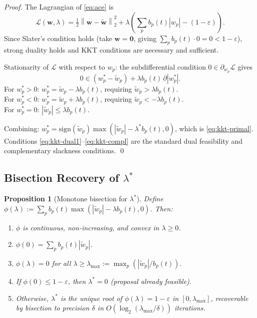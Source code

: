 \documentclass[12pt,letterpaper]{article}
\newtheorem{proposition}[theorem]{Proposition}
\newcommand{\Hnorm}[1]{\left\|#1\right\|}
\newcommand{\bp}{b_p(t)}
\newcommand{\eps}{\varepsilon}
\newcommand{\lam}{\lambda}
\newcommand{\lamstar}{\lambda^*}
\begin{document}
\begin{proof}
The Lagrangian of \eqref{eq:ace} is
\[
  \mathcal{L}(\mathbf{w}, \lam)
  = \tfrac{1}{2}\Hnorm{\mathbf{w} - \tilde{\mathbf{w}}}_2^2
  + \lam\!\left(\sum_p \bp |w_p| - (1-\eps)\right).
\]
Since Slater's condition holds (take $\mathbf{w} = \mathbf{0}$, giving
$\sum_p \bp \cdot 0 = 0 < 1-\eps$), strong duality holds and KKT
conditions are necessary and sufficient.

Stationarity of $\mathcal{L}$ with respect to $w_p$: the subdifferential
condition $0 \in \partial_{w_p}\mathcal{L}$ gives
\[
  0 \in (w_p^* - \tilde{w}_p) + \lam \bp\, \partial|w_p^*|.
\]
For $w_p^* > 0$: $w_p^* = \tilde{w}_p - \lam \bp$, requiring
$\tilde{w}_p > \lam \bp$.\\
For $w_p^* < 0$: $w_p^* = \tilde{w}_p + \lam \bp$, requiring
$\tilde{w}_p < -\lam \bp$.\\
For $w_p^* = 0$: $|\tilde{w}_p| \leq \lam \bp$.

Combining: $w_p^* = \mathrm{sign}(\tilde{w}_p)\max(|\tilde{w}_p| -
\lamstar\bp, 0)$, which is \eqref{eq:kkt-primal}.
Conditions \eqref{eq:kkt-dual1}--\eqref{eq:kkt-compl} are the standard
dual feasibility and complementary slackness conditions.
\qed
\end{proof}

\subsection{Bisection Recovery of \texorpdfstring{$\lamstar$}{lambda*}}

\begin{proposition}[Monotone bisection for $\lamstar$]
\label{prop:bisection}
Define $\phi(\lam) := \sum_p \bp \max(|\tilde{w}_p| - \lam \bp, 0)$.
Then:
\begin{enumerate}[label=(\alph*)]
  \item $\phi$ is continuous, non-increasing, and convex in $\lam \geq 0$.
  \item $\phi(0) = \sum_p \bp |\tilde{w}_p|$.
  \item $\phi(\lam) = 0$ for all $\lam \geq \lam_{\max} :=
        \max_p (|\tilde{w}_p| / \bp)$.
  \item If $\phi(0) \leq 1-\eps$, then $\lamstar = 0$ (proposal
        already feasible).
  \item Otherwise, $\lamstar$ is the unique root of $\phi(\lam) = 1-\eps$
        in $[0, \lam_{\max}]$, recoverable by bisection to precision
        $\delta$ in $O(\log_2(\lam_{\max}/\delta))$ iterations.
\end{enumerate}
\end{proposition}
\end{document}

